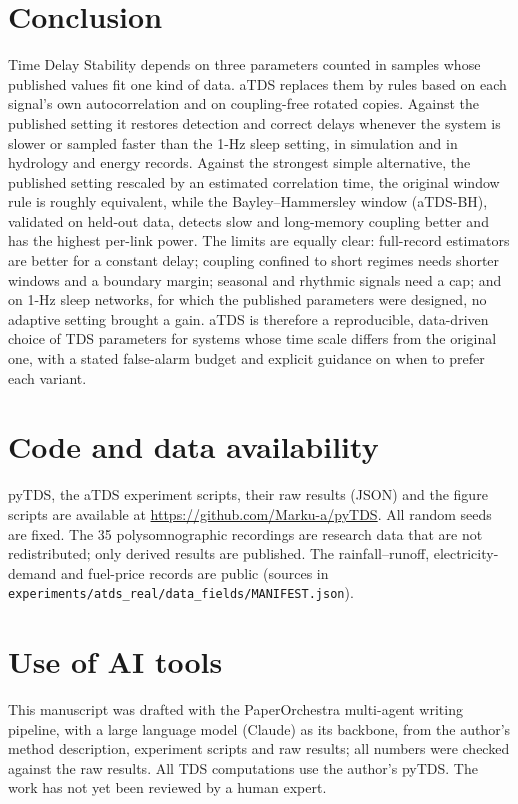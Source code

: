 \documentclass[11pt,a4paper]{article}
\begin{document}
\section{Conclusion}
\label{sec:conclusion}
Time Delay Stability depends on three parameters counted in samples whose published values fit one kind of data. aTDS replaces them by rules based on each signal's own autocorrelation and on coupling-free rotated copies. Against the published setting it restores detection and correct delays whenever the system is slower or sampled faster than the 1-Hz sleep setting, in simulation and in hydrology and energy records. Against the strongest simple alternative, the published setting rescaled by an estimated correlation time, the original window rule is roughly equivalent, while the Bayley--Hammersley window (aTDS-BH), validated on held-out data, detects slow and long-memory coupling better and has the highest per-link power. The limits are equally clear: full-record estimators are better for a constant delay; coupling confined to short regimes needs shorter windows and a boundary margin; seasonal and rhythmic signals need a cap; and on 1-Hz sleep networks, for which the published parameters were designed, no adaptive setting brought a gain. aTDS is therefore a reproducible, data-driven choice of TDS parameters for systems whose time scale differs from the original one, with a stated false-alarm budget and explicit guidance on when to prefer each variant.

\section*{Code and data availability}
pyTDS, the aTDS experiment scripts, their raw results (JSON) and the figure scripts are available at \url{https://github.com/Marku-a/pyTDS}. All random seeds are fixed. The 35 polysomnographic recordings are research data that are not redistributed; only derived results are published. The rainfall--runoff, electricity-demand and fuel-price records are public (sources in \texttt{experiments/atds\_real/data\_fields/MANIFEST.json}).

\section*{Use of AI tools}
This manuscript was drafted with the PaperOrchestra multi-agent writing pipeline, with a large language model (Claude) as its backbone, from the author's method description, experiment scripts and raw results; all numbers were checked against the raw results. All TDS computations use the author's pyTDS. The work has not yet been reviewed by a human expert.




\end{document}
